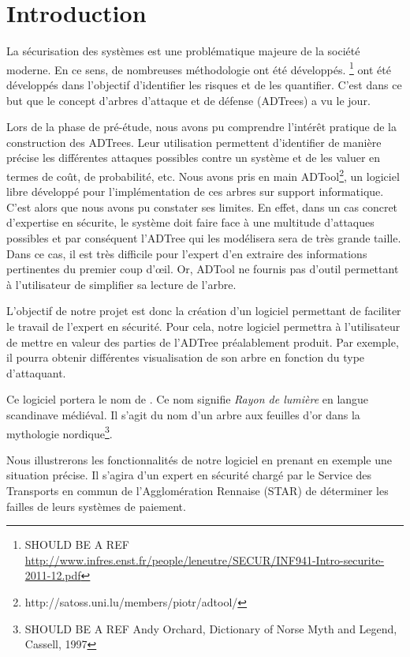 \section{Introduction}
	
	La sécurisation des systèmes est une problématique majeure de la société moderne. En ce sens, de nombreuses méthodologie ont été développés. \footnote{SHOULD BE A REF \url{http://www.infres.enst.fr/people/leneutre/SECUR/INF941-Intro-securite-2011-12.pdf}}
	ont été développés dans l'objectif d'identifier les risques et de les quantifier. C'est dans ce but que le concept d'arbres d'attaque et de défense (ADTrees) a vu le jour.
	
	Lors de la phase de pré-étude, nous avons pu comprendre l’intérêt pratique de la construction des ADTrees. Leur utilisation permettent d'identifier de manière précise les différentes attaques possibles contre un système et de les valuer en termes de coût, de probabilité, etc. Nous avons pris en main ADTool\footnote{http://satoss.uni.lu/members/piotr/adtool/}, un logiciel libre développé pour l'implémentation de ces arbres sur support informatique. C'est alors que nous avons pu constater ses limites. En effet, dans un cas concret d'expertise en sécurite, le système doit faire face à une multitude d'attaques possibles et par conséquent l'ADTree qui les modélisera sera de très grande taille. Dans ce cas, il est très difficile pour l'expert d'en extraire des informations pertinentes du premier coup d’œil. Or, ADTool ne fournis pas d'outil permettant à l'utilisateur de simplifier sa lecture de l'arbre. 

	L'objectif de notre projet est donc la création d'un logiciel permettant de faciliter le travail de l'expert en sécurité. Pour cela, notre logiciel permettra à l'utilisateur de mettre en valeur des parties de l'ADTree préalablement produit. Par exemple, il pourra obtenir différentes visualisation de son arbre en fonction du type d'attaquant. %
	
	Ce logiciel portera le nom de \glasir. Ce nom signifie \textit{Rayon de lumière} en langue scandinave médiéval. Il s'agit du nom d'un arbre aux feuilles d'or dans la mythologie nordique\footnote{SHOULD BE A REF Andy Orchard, Dictionary of Norse Myth and Legend, Cassell, 1997}.

	Nous illustrerons les fonctionnalités de notre logiciel en prenant en exemple une situation précise. Il s'agira d'un expert en sécurité chargé par le Service des Transports en commun de l'Agglomération Rennaise (STAR) de déterminer les failles de leurs systèmes de paiement. 